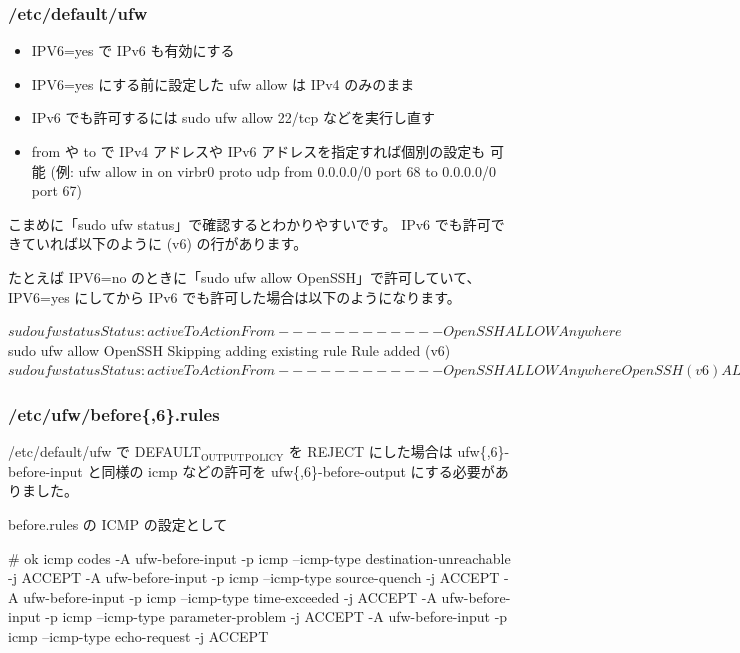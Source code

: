 \documentclass[mingoth,a4paper]{jsarticle}
\begin{document}
\subsubsection{/etc/default/ufw}

\begin{itemize}
\item IPV6=yes で IPv6 も有効にする
\item IPV6=yes にする前に設定した ufw allow は IPv4 のみのまま
\item IPv6 でも許可するには sudo ufw allow 22/tcp などを実行し直す
\item from や to で IPv4 アドレスや IPv6 アドレスを指定すれば個別の設定も
  可能 (例: ufw allow in on virbr0 proto udp from 0.0.0.0/0 port 68 to
  0.0.0.0/0 port 67)
\end{itemize}


こまめに「sudo ufw status」で確認するとわかりやすいです。
IPv6 でも許可できていれば以下のように (v6) の行があります。

たとえば IPV6=no のときに「sudo ufw allow OpenSSH」で許可していて、
IPV6=yes にしてから IPv6 でも許可した場合は以下のようになります。

\begin{commandline}
$ sudo ufw status
Status: active

To                         Action      From
--                         ------      ----
OpenSSH                    ALLOW       Anywhere

$ sudo ufw allow OpenSSH
Skipping adding existing rule
Rule added (v6)
$ sudo ufw status
Status: active

To                         Action      From
--                         ------      ----
OpenSSH                    ALLOW       Anywhere
OpenSSH (v6)               ALLOW       Anywhere (v6)

$
\end{commandline}
\subsubsection{/etc/ufw/before\{,6\}.rules}

/etc/default/ufw で DEFAULT$_{\mathrm{OUTPUT}}$$_{\mathrm{POLICY}}$ を REJECT にした場合は
ufw\{,6\}-before-input と同様の icmp などの許可を
ufw\{,6\}-before-output にする必要がありました。

before.rules の ICMP の設定として

\begin{commandline}
# ok icmp codes
-A ufw-before-input -p icmp --icmp-type destination-unreachable -j ACCEPT
-A ufw-before-input -p icmp --icmp-type source-quench -j ACCEPT
-A ufw-before-input -p icmp --icmp-type time-exceeded -j ACCEPT
-A ufw-before-input -p icmp --icmp-type parameter-problem -j ACCEPT
-A ufw-before-input -p icmp --icmp-type echo-request -j ACCEPT
\end{commandline}
\end{document}
